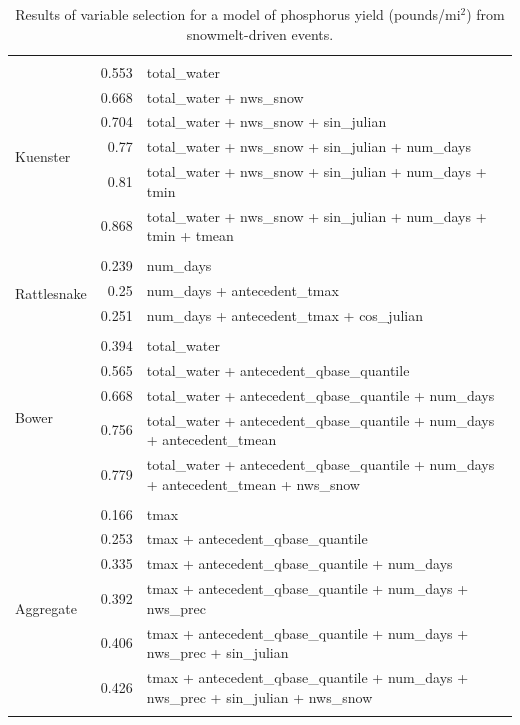\documentclass[10pt]{article}
\begin{document}
\begin{table}[h]
\begin{center}
\begin{tabular}{lrl}
\vspace{2mm}\\ \multirow{7}{*}{Kuenster} & 0.553 & total\_water\\ 
 & 0.668 & total\_water + nws\_snow\\ 
 & 0.704 & total\_water + nws\_snow + sin\_julian\\ 
 & 0.77 & total\_water + nws\_snow + sin\_julian + num\_days\\ 
 & 0.81 & total\_water + nws\_snow + sin\_julian + num\_days + tmin\\ 
 & 0.868 & total\_water + nws\_snow + sin\_julian + num\_days + tmin + tmean\\ 
\vspace{2mm}\\ \multirow{4}{*}{Rattlesnake} & 0.239 & num\_days\\ 
 & 0.25 & num\_days + antecedent\_tmax\\ 
 & 0.251 & num\_days + antecedent\_tmax + cos\_julian\\ 
\vspace{2mm}\\ \multirow{6}{*}{Bower} & 0.394 & total\_water\\ 
 & 0.565 & total\_water + antecedent\_qbase\_quantile\\ 
 & 0.668 & total\_water + antecedent\_qbase\_quantile + num\_days\\ 
 & 0.756 & total\_water + antecedent\_qbase\_quantile + num\_days + antecedent\_tmean\\ 
 & 0.779 & total\_water + antecedent\_qbase\_quantile + num\_days + antecedent\_tmean + nws\_snow\\ 
\vspace{2mm}\\ \multirow{7}{*}{Aggregate} & 0.166 & tmax\\ 
 & 0.253 & tmax + antecedent\_qbase\_quantile\\ 
 & 0.335 & tmax + antecedent\_qbase\_quantile + num\_days\\ 
 & 0.392 & tmax + antecedent\_qbase\_quantile + num\_days + nws\_prec\\ 
 & 0.406 & tmax + antecedent\_qbase\_quantile + num\_days + nws\_prec + sin\_julian\\ 
 & 0.426 & tmax + antecedent\_qbase\_quantile + num\_days + nws\_prec + sin\_julian + nws\_snow\\ 
\vspace{2mm}\\     \end{tabular}
    \caption{Results of variable selection for a model of phosphorus yield (pounds/$\text{mi}^2$) from snowmelt-driven events.\label{phos_r_square_snow}}
    \end{center}
\end{table}
\end{document}
